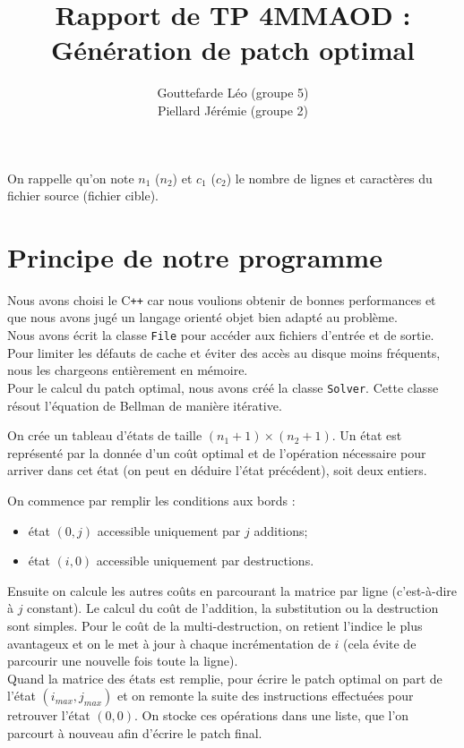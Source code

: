 \documentclass[a4paper, 10pt, french]{article}
\title{Rapport de TP 4MMAOD : Génération de patch optimal}
\author{
{\sc Gouttefarde} Léo (groupe 5)\\
{\sc Piellard} Jérémie (groupe 2)
}
\begin{document}
\maketitle

On rappelle qu'on note $n_1$ ($n_2$) et $c_1$ ($c_2$) le nombre de lignes et caractères du fichier source (fichier cible).

\section{Principe de notre  programme}
Nous avons choisi le C\texttt{++} car nous voulions obtenir de bonnes performances
et que nous avons jugé un langage orienté objet bien adapté au problème.\\

Nous avons écrit la classe \texttt{File} pour accéder aux fichiers d'entrée et de sortie. Pour limiter les défauts de cache et éviter des accès au disque moins fréquents, nous les chargeons entièrement en mémoire.\\

Pour le calcul du patch optimal, nous avons créé la classe \texttt{Solver}.
Cette classe résout l'équation de Bellman de manière itérative.

On crée un tableau d'états de taille $(n_1+1)\times(n_2+1)$.
Un état est représenté par la donnée d'un coût optimal et de l'opération nécessaire pour arriver dans cet état
(on peut en déduire l'état précédent), soit deux entiers.

On commence par remplir les conditions aux bords :
\begin{itemize}
\item état $(0,j)$ accessible uniquement par $j$ additions;
\item état $(i,0)$ accessible uniquement par destructions.
\end{itemize}

Ensuite on calcule les autres coûts en parcourant la matrice par ligne
(c'est-à-dire à $j$ constant).
Le calcul du coût de l'addition, la substitution ou la destruction sont simples.
Pour le coût de la multi-destruction, on retient l'indice le plus avantageux
et on le met à jour à chaque incrémentation de $i$ (cela évite de parcourir une nouvelle fois toute la ligne).\\

Quand la matrice des états est remplie, pour écrire le patch optimal on part de l'état $(i_{max}, j_{max})$
et on remonte la suite des instructions effectuées pour retrouver l'état $(0,0)$.
On stocke ces opérations dans une liste, que l'on parcourt à nouveau afin d'écrire le patch final.
\end{document}
